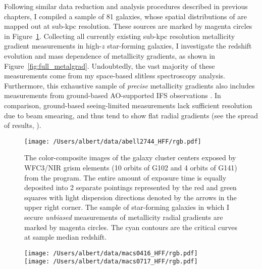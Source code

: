 \begin{landscape}

\end{landscape}

Following similar data reduction and analysis procedures described in previous chapters, I compiled a sample of 81
galaxies, whose spatial distributions of \gpm are mapped out at sub-kpc resolution. These sources are marked by
magenta circles in Figure~\ref{fig:full_clusters}.
Collecting all currently existing sub-kpc resolution metallicity gradient measurements in high-$z$ star-forming
galaxies, I investigate the redshift evolution and mass dependence of metallicity gradients, as shown in
Figure~\ref{fig:full_metalgrad}.
Undoubtedly, the vast majority of these measurements come from my space-based slitless spectroscopy analysis.
Furthermore, this exhaustive sample of \emph{precise} metallicity gradients also includes measurements from ground-based AO-supported IFS observations \citep{2012MNRAS.426..935S,2013ApJ...765...48J,2015arXiv150901279L}. 
In comparison, ground-based seeing-limited measurements lack sufficient resolution due to beam smearing, 
and thus tend to show flat radial gradients (see the spread of \kd results, \citet{2016ApJ...827...74W}).

\begin{figure}
    \centering
    \texttt{[image: /Users/albert/data/abell2744\_HFF/rgb.pdf]}\\
    \caption[\glass grism exposures and source selection in this work.]
    {The color-composite images of the galaxy cluster centers exposed by \hst WFC3/NIR grism elements (10 orbits
    of G102 and 4 orbits of G141) from the \glass program. The entire amount of exposure time is equally
    deposited into 2 separate pointings represented by the red and green squares with light dispersion directions
    denoted by the arrows in the upper right corner.
    The sample of star-forming galaxies in which I secure \emph{unbiased} measurements of metallicity radial gradients are marked by magenta circles.
    The cyan contours are the critical curves at sample median redshift.
    }
    \label{fig:full_clusters}
\end{figure}

\begin{figure}
    \centering
    \texttt{[image: /Users/albert/data/macs0416\_HFF/rgb.pdf]}\\
    \texttt{[image: /Users/albert/data/macs0717\_HFF/rgb.pdf]}
\end{figure}

